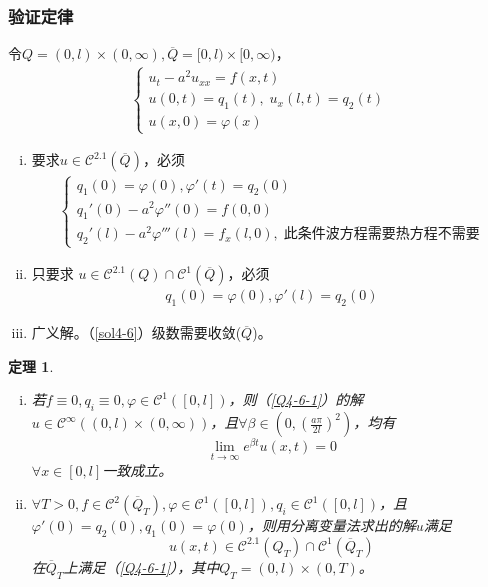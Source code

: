 \documentclass[11pt, a4paper]{article}
\theoremstyle{theorem}
\newtheorem{thm}{定理}[section]
\begin{document}
\subsubsection{验证定律}

令$Q = (0,l) \times (0,\infty), \overline{Q} = [0,l) \times [0,\infty)$，
\begin{align}
    \begin{cases}
      u_t - a^2 u_{xx} = f(x,t) \\
      u(0,t) = q_1(t), \; u_x(l,t) = q_2(t) \\
      u(x,0) = \varphi(x)
    \end{cases}
\end{align}

\begin{enumerate}[(i)]
  \item 要求$u \in \mathcal{C}^{2.1}(\overline{Q})$，必须
  \begin{align}
      \begin{cases}
        q_1(0) = \varphi(0), \varphi'(t) = q_2(0) \\
        q_1'(0) - a^2 \varphi''(0) = f(0,0) \\
        q_2'(l) - a^2 \varphi'''(l) = f_x(l,0), \; \text{此条件波方程需要热方程不需要}
      \end{cases}
  \end{align}
  \item 只要求 $u \in \mathcal{C}^{2.1}(Q) \cap \mathcal{C}^{1}(\overline{Q})$，必须
  \begin{align*}
      q_1(0) = \varphi(0), \varphi'(l) = q_2(0)
  \end{align*}
  \item 广义解。（\ref{sol4-6}）级数需要收敛($\overline{Q}$)。
\end{enumerate}

\begin{thm}
\begin{enumerate}[(i)]
  \item 若$f \equiv 0, q_i \equiv 0, \varphi \in \mathcal{C}^1([0,l])$，则（\ref{Q4-6-1}）的解$u \in \mathcal{C}^\infty((0,l) \times (0,\infty))$，且$\forall \beta \in (0, (\frac{a\pi}{2l})^2)$，均有
  $$
  \lim\limits_{t \rightarrow \infty} e^{\beta t} u(x,t) = 0
  $$
  $\forall x \in [0,l]$一致成立。
  \item $\forall T > 0, f \in \mathcal{C}^2(\overline{Q}_T), \varphi \in \mathcal{C}^1([0,l]), q_i \in \mathcal{C}^1([0,l])$，且$\varphi'(0) = q_2(0), q_1(0) = \varphi(0)$，则用分离变量法求出的解$u$满足
  $$
  u(x,t) \in \mathcal{C}^{2.1} (Q_T) \cap \mathcal{C}^1(\overline{Q}_T)
  $$
  在$\overline{Q}_T$上满足（\ref{Q4-6-1}），其中$Q_T = (0,l) \times (0,T)$。
\end{enumerate}
\end{thm}
\end{document}
